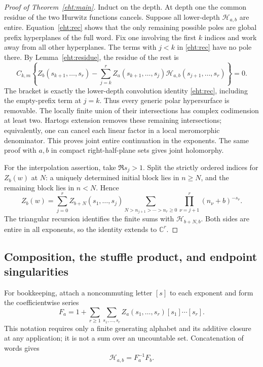 \begin{proof}[Proof of Theorem~\ref{eht:main}]
Induct on the depth.  At depth one the common residue of the two Hurwitz
functions cancels.  Suppose all lower-depth $\mathcal H_{a,b}$ are entire.
Equation~\eqref{eht:rec} shows that the only remaining possible poles are
global prefix hyperplanes of the full word.  Fix one involving the first
$k$ indices and work away from all other hyperplanes.  The terms with
$j<k$ in \eqref{eht:rec} have no pole there.  By
Lemma~\ref{eht:residue}, the residue of the rest is
\[
 C_{k,m}\left\{
 Z_b(s_{k+1},\ldots,s_r)
 -\sum_{j=k}^rZ_a(s_{k+1},\ldots,s_j)
                  \mathcal H_{a,b}(s_{j+1},\ldots,s_r)
 \right\}=0.
\]
The bracket is exactly the lower-depth convolution identity
\eqref{eht:rec}, including the empty-prefix term at $j=k$.
Thus every generic polar hypersurface is removable.  The locally finite
union of their intersections has complex codimension at least two.
Hartogs extension removes these remaining intersections; equivalently,
one can cancel each linear factor in a local meromorphic denominator.
This proves joint entire continuation in the exponents.  The same proof
with $a,b$ in compact right-half-plane sets gives joint holomorphy.

For the interpolation assertion, take $\Re s_j>1$.  Split the strictly
ordered indices for $Z_b(w)$ at $N$: a uniquely determined initial block
lies in $n\ge N$, and the remaining block lies in $n<N$.  Hence
\[
 Z_b(w)=\sum_{j=0}^rZ_{b+N}(s_1,\ldots,s_j)
   \sum_{N>n_{j+1}>\cdots>n_r\ge0}
                    \prod_{\nu=j+1}^r(n_\nu+b)^{-s_\nu}.
\]
The triangular recursion identifies the finite sums with
$\mathcal H_{b+N,b}$.  Both sides are entire in all exponents, so the
identity extends to $\mathbb C^r$.
\end{proof}

\subsection{Composition, the stuffle product, and endpoint singularities}

For bookkeeping, attach a noncommuting letter $[s]$ to each exponent and
form the coefficientwise series
\[
 F_a=1+\sum_{r\ge1}\sum_{s_1,\ldots,s_r}
             Z_a(s_1,\ldots,s_r)[s_1]\cdots[s_r].
\]
This notation requires only a finite generating alphabet and its additive
closure at any application; it is not a sum over an uncountable set.
Concatenation of words gives
\begin{equation}\label{eht:quotient}
 \mathcal H_{a,b}=F_a^{-1}F_b.
\end{equation}

